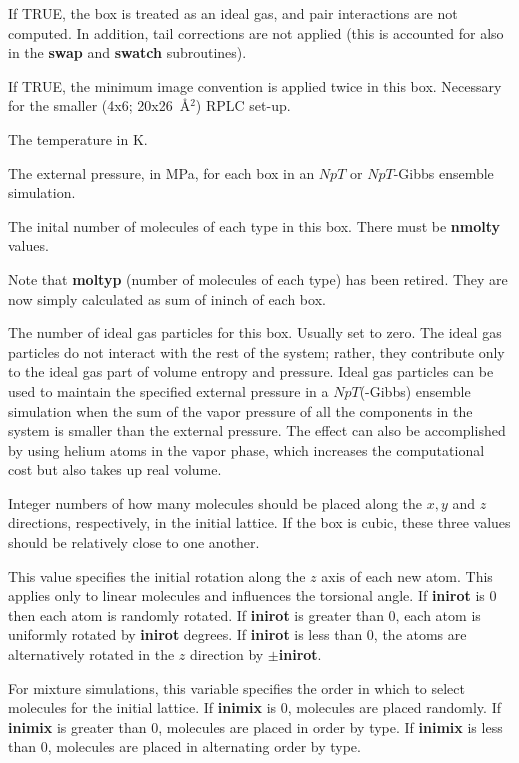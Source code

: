 \documentclass[12pt,letterpaper]{article}
\begin{document}
 If TRUE, the box is treated as an
ideal gas, and pair interactions are not computed. In
addition, tail corrections are not applied (this is
accounted for also in the {\bf swap} and {\bf swatch}
subroutines).

 If TRUE, the minimum image convention
is applied twice in this box. Necessary for the smaller
(4x6; 20x26~\AA$^2$) RPLC set-up.

 The temperature in K.

 The external pressure, in MPa, for
each box in an $NpT$ or $NpT$-Gibbs ensemble simulation.

 The inital number of molecules of each
type in this box. There must be {\bf nmolty} values.

Note that {\bf moltyp} (number of molecules of each type)
has been retired. They are now simply calculated as sum of
ininch of each box.

 The number of ideal gas
particles for this box. Usually set to zero. The ideal gas
particles do not interact with the rest of the system;
rather, they contribute only to the ideal gas part of volume
entropy and pressure. Ideal gas particles can be used to
maintain the specified external pressure in a $NpT$(-Gibbs)
ensemble simulation when the sum of the vapor pressure of
all the components in the system is smaller than the
external pressure. The effect can also be accomplished by
using helium atoms in the vapor phase, which increases the
computational cost but also takes up real volume.

 Integer numbers of how many
molecules should be placed along the $x, y$ and $z$
directions, respectively, in the initial lattice. If the box
is cubic, these three values should be relatively close to
one another.

 This value specifies the initial
rotation along the $z$ axis of each new atom. This applies
only to linear molecules and influences the torsional angle.
If {\bf inirot} is 0 then each atom is randomly rotated. If
{\bf inirot} is greater than 0, each atom is uniformly
rotated by {\bf inirot} degrees. If {\bf inirot} is less
than 0, the atoms are alternatively rotated in the $z$
direction by $\pm$\textbf{inirot}.

 For mixture simulations, this
variable specifies the order in which to select molecules
for the initial lattice. If {\bf inimix} is 0, molecules are
placed randomly. If {\bf inimix} is greater than 0,
molecules are placed in order by type. If {\bf inimix} is
less than 0, molecules are placed in alternating order by
type.
\end{document}
